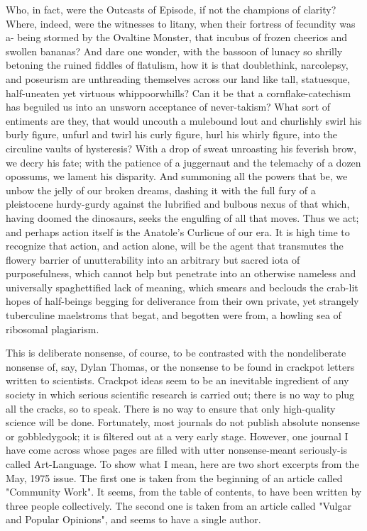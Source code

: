           Who, in fact, were the Outcasts of Episode, if not the champions of clarity?
  Where, indeed, were the witnesses to litany, when their fortress of fecundity was a-
  being stormed by the Ovaltine Monster, that incubus of frozen cheerios and swollen
  bananas? And dare one wonder, with the bassoon of lunacy so shrilly betoning the
  ruined fiddles of flatulism, how it is that doublethink, narcolepsy, and poseurism
  are unthreading themselves across our land like tall, statuesque, half-uneaten yet
  virtuous whippoorwhills? Can it be that a cornflake-catechism has beguiled us into
  an unsworn acceptance of never-takism?
          What sort of entiments are they, that would uncouth a mulebound lout and
  churlishly swirl his burly figure, unfurl and twirl his curly figure, hurl his whirly
  figure, into the circuline vaults of hysteresis? With a drop of sweat unroasting his
  feverish brow, we decry his fate; with the patience of a juggernaut and the
  telemachy of a dozen opossums, we lament his disparity. And summoning all the
  powers that be, we unbow the jelly of our broken dreams, dashing it with the full
  fury of a pleistocene hurdy-gurdy against the lubrified and bulbous nexus of that
  which, having doomed the dinosaurs, seeks the engulfing of all that moves.
          Thus we act; and perhaps action itself is the Anatole's Curlicue of our era. It
  is high time to recognize that action, and action alone, will be the agent that
  transmutes the flowery barrier of unutterability into an arbitrary but sacred iota of
  purposefulness, which cannot help but penetrate into an otherwise nameless and
  universally spaghettified lack of meaning, which smears and beclouds the crab-lit
  hopes of half-beings begging for deliverance from their own private, yet strangely
  tuberculine maelstroms that begat, and begotten were from, a howling sea of
  ribosomal plagiarism.

This is deliberate nonsense, of course, to be contrasted with the nondeliberate nonsense
of, say, Dylan Thomas, or the nonsense to be found in crackpot letters written to
scientists. Crackpot ideas seem to be an inevitable ingredient of any society in which
serious scientific research is carried out; there is no way to plug all the cracks, so to
speak. There is no way to ensure that only high-quality science will be done. Fortunately,
most journals do not publish absolute nonsense or gobbledygook; it is filtered out at a
very early stage. However, one journal I have come across whose pages are filled with
utter nonsense-meant seriously-is called Art-Language. To show what I mean, here are
two short excerpts from the May, 1975 issue. The first one is taken from the beginning of
an article called "Community Work". It seems, from the table of contents, to have been
written by three people collectively. The second one is taken from an article called
"Vulgar and Popular Opinions", and seems to have a single author.


